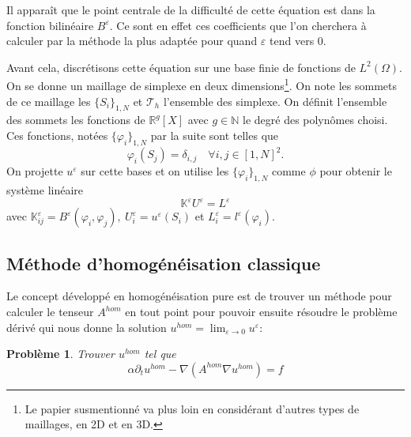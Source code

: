 \documentclass[11pt]{article}
\newtheorem{pb}{Problème}
\newcommand{\N}{\mathbb{N}}
\newcommand{\R}{\mathbb{R}}
\newcommand{\K}{\mathbb{K}}
\newcommand{\T}{\mathcal{T}}
\newcommand{\Ah}{A^{hom}}
\newcommand{\uh}{u^{hom}}
\newcommand{\Be}{B^\varepsilon}
\newcommand{\ue}{u^\varepsilon}
\begin{document}
Il apparaît que le point centrale de la difficulté de cette équation est dans la fonction bilinéaire $\Be$. Ce sont en effet ces coefficients que l'on
cherchera à calculer par la méthode la plus adaptée pour quand $\varepsilon$ tend vers 0.

Avant cela, discrétisons cette équation sur une base finie de fonctions de $L^2(\Omega)$. On se donne un maillage de simplexe en deux
dimensions\footnote{Le papier susmentionné va plus loin en considérant d'autres types de maillages, en 2D et en 3D.}. On note les sommets de ce maillage
les $\{S_i\}_{1, N}$ et $\T_h$ l'ensemble des simplexe. On définit l'ensemble des sommets les fonctions de $\R^g[X]$ avec $g\in\N$ le degré des polynômes
choisi. Ces fonctions, notées $\{\varphi_i\}_{1, N}$ par la suite sont telles que
\[
  \varphi_i(S_j) = \delta_{i,j} \quad \forall i, j \in [1, N]^2.
\]
On projette $\ue$ sur cette bases et on utilise les $\{\varphi_i\}_{1, N}$ comme $\phi$ pour obtenir le système linéaire 
\[
  \K^\varepsilon U^\varepsilon = L^\varepsilon
\]
avec $\K^\varepsilon_{ij} = \Be(\varphi_i, \varphi_j), ~ U^\varepsilon_i = \ue(S_i)$ et $L^\varepsilon_i = l^\varepsilon(\varphi_i)$.


\subsection{Méthode d'homogénéisation classique}
  
Le concept développé en homogénéisation pure est de trouver un méthode pour calculer le tenseur $\Ah$ en tout point pour pouvoir ensuite résoudre le
problème dérivé qui nous donne la solution $\uh=\lim_{\varepsilon\to 0}\ue$:
\begin{pb}
  Trouver $\uh$ tel que
  \begin{equation*}
    \alpha \partial_t \uh -\nabla(\Ah \nabla \uh) = f
  \end{equation*}
\end{pb}
\end{document}
